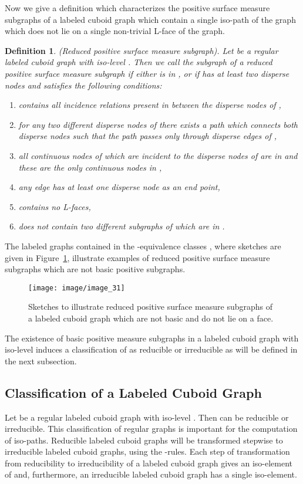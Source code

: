\documentclass[a4paper,11pt]{article}
\newtheorem{definition}[theorem]{Definition}
\begin{document}
Now we give a definition which characterizes the positive surface measure subgraphs of a labeled cuboid graph
which contain a single iso-path of the graph which does not lie on a single non-trivial L-face of the graph.
\begin{definition}(Reduced positive surface measure subgraph). Let  be a regular
labeled cuboid graph with iso-level . Then we call the subgraph 
of  a reduced positive surface measure subgraph if either  is in , or if  has at
least two disperse nodes and satisfies the following conditions:
\begin{enumerate}
\item  contains all incidence relations present in  between the disperse nodes of
,
\item for any two different disperse nodes of  there exists a path which connects both disperse nodes such that
the path passes only through disperse edges of ,
\item all continuous nodes of  which are incident to the disperse nodes of  are in  and these
are the only continuous nodes in ,
\item any edge  has at least one disperse node as an end point,
\item  contains no L-faces,
\item  does not contain two different subgraphs of  which are in .
\end{enumerate}
\label{def:positive-surface-measure-graph}
\end{definition}
The labeled graphs contained in the -equivalence classes ,
where sketches  are given in Figure~\ref{image_31}, illustrate examples of reduced
positive surface measure subgraphs which are not basic positive subgraphs.
\begin{figure}[!ht]
\texttt{[image: image/image\_31]}
\caption{Sketches  to  illustrate reduced positive surface measure subgraphs of a labeled
cuboid graph which are not basic and do not lie on a face.}
\label{image_31}
\end{figure}
\FloatBarrier
The existence of basic positive measure subgraphs in a labeled cuboid graph  with iso-level 
induces a classification of  as reducible or irreducible as will be defined in the next subsection.

\subsection{Classification of a Labeled Cuboid Graph}
Let  be a regular labeled cuboid graph with iso-level . Then  can
be reducible or irreducible. This classification of regular graphs is important for the computation of
iso-paths. Reducible labeled cuboid graphs will be transformed stepwise to irreducible labeled cuboid
graphs, using the -rules. Each step of transformation from reducibility to irreducibility of a
labeled cuboid graph  gives an iso-element of  and, furthermore, an irreducible labeled cuboid
graph has a single iso-element.
\end{document}
